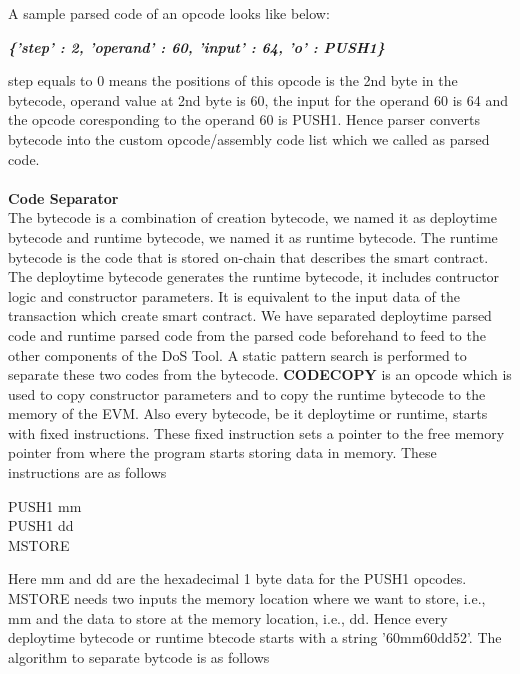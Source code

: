 \documentclass{article}
\begin{document}
\newpage
\noindent A sample parsed code of an opcode looks like below:\\
\begin{center}
    \textbf{\emph{\{'step' : 2, 'operand' : 60, 'input' : 64, 'o' : PUSH1\}}}
\end{center} 
step equals to 0 means the positions of this opcode is the 2nd byte in the bytecode, operand value at 2nd byte is 60, the input for the operand 60 is 64 and the opcode coresponding to the operand 60 is PUSH1. Hence parser converts bytecode into the custom opcode/assembly code list which we called as parsed code.\\
\\
\textbf{Code Separator}\\
The bytecode is a combination of creation bytecode, we named it as deploytime bytecode and runtime bytecode, we named it as runtime bytecode. The runtime bytecode is the code that is stored on-chain that describes the smart contract. The deploytime bytecode generates the runtime bytecode, it includes contructor logic and constructor parameters. It is equivalent to the input data of the transaction which create smart contract. We have separated deploytime parsed code and runtime parsed code from the parsed code beforehand to feed to the other components of the DoS Tool. A static pattern search is performed to separate these two codes from the bytecode. \textbf{CODECOPY} is an opcode which is used to copy constructor parameters and to copy the runtime bytecode to the memory of the EVM. Also every bytecode, be it deploytime or runtime, starts with fixed instructions. These fixed instruction sets a pointer to the free memory pointer from where the program starts storing data in memory. These instructions are as follows\\
\begin{center}
    PUSH1 mm\\
    PUSH1 dd\\
    MSTORE
\end{center}
Here mm and dd are the hexadecimal 1 byte data for the PUSH1 opcodes. MSTORE needs two inputs the memory location where we want to store, i.e., mm and the data to store at the memory location, i.e., dd. Hence every deploytime bytecode or runtime btecode starts with a string '60mm60dd52'. The algorithm to separate bytcode is as follows\\
\newpage
\end{document}
